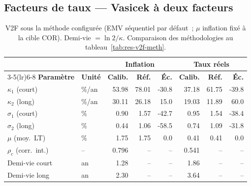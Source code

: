 \documentclass[11pt,a4paper]{article}
\theoremstyle{definition}
\begin{document}
\subsection{Facteurs de taux --- Vasicek à deux facteurs}
\begin{table}[H]\centering\small\renewcommand{\arraystretch}{1.25}\setlength{\tabcolsep}{5pt}
\begin{tabularx}{\textwidth}{@{}l X r r r r r r@{}}
\toprule
& & \multicolumn{3}{c}{\textbf{Inflation}} & \multicolumn{3}{c}{\textbf{Taux réels}}\\
\cmidrule(lr){3-5}\cmidrule(lr){6-8}
\textbf{Paramètre} & \textbf{Unité} & \textbf{Calib.} & \textbf{Réf.} & \textbf{Éc.} & \textbf{Calib.} & \textbf{Réf.} & \textbf{Éc.}\\
\midrule
$\kappa_1$ (court) & \%/an & 53.98 & 78.01 & -30.8 & 37.18 & 61.75 & -39.8\\
$\kappa_2$ (long) & \%/an & 30.11 & 26.18 & 15.0 & 19.03 & 11.89 & 60.0\\
$\sigma_1$ (court) & \% & 0.90 & 1.57 & -42.7 & 0.95 & 1.54 & -38.4\\
$\sigma_2$ (long) & \% & 0.44 & 1.06 & -58.5 & 0.74 & 1.09 & -31.8\\
$\mu$ (moy.\ LT) & \% & 1.75 & 1.75 & 0.0 & 0.41 & 0.41 & 0.0\\
$\rho_c$ (corr.\ int.) & -- & 0.796 & -- & -- & 0.541 & -- & --\\
\addlinespace
Demi-vie court & an & 1.28 & -- & -- & 1.86 & -- & --\\
Demi-vie long & an & 2.30 & -- & -- & 3.64 & -- & --\\
\bottomrule\end{tabularx}
\caption{V2F sous la méthode configurée (EMV séquentiel par défaut~; $\mu$ inflation fixé à la cible COR). Demi-vie $=\ln 2/\kappa$. Comparaison des méthodologies au tableau~\ref{tab:res-v2f-meth}.}\label{tab:res-v2f}
\end{table}
\end{document}
